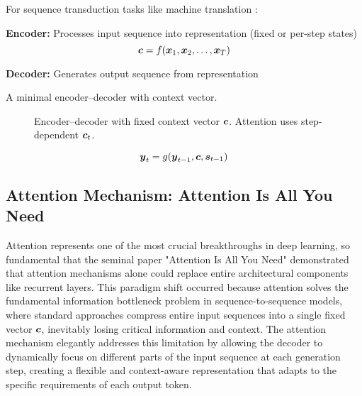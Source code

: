 For sequence transduction tasks like machine translation \cite{Cho2014,Bahdanau2014}:

\textbf{Encoder:} Processes input sequence into representation (fixed or per-step states)
\begin{equation}
\boldsymbol{c} = f(\boldsymbol{x}_1, \boldsymbol{x}_2, \ldots, \boldsymbol{x}_T)
\end{equation}

\textbf{Decoder:} Generates output sequence from representation


A minimal encoder–decoder with context vector.
\begin{figure}[h]
    \centering
    \caption{Encoder–decoder with fixed context vector $\boldsymbol{c}$. Attention uses step-dependent $\boldsymbol{c}_t$.}
\end{figure}

\begin{equation}
\boldsymbol{y}_t = g(\boldsymbol{y}_{t-1}, \boldsymbol{c}, \boldsymbol{s}_{t-1})
\end{equation}

\subsection{Attention Mechanism: Attention Is All You Need}

Attention represents one of the most crucial breakthroughs in deep learning, so fundamental that the seminal paper "Attention Is All You Need" \cite{Vaswani2017} demonstrated that attention mechanisms alone could replace entire architectural components like recurrent layers. This paradigm shift occurred because attention solves the fundamental information bottleneck problem in sequence-to-sequence models, where standard approaches compress entire input sequences into a single fixed vector $\boldsymbol{c}$, inevitably losing critical information and context. The attention mechanism elegantly addresses this limitation by allowing the decoder to dynamically focus on different parts of the input sequence at each generation step, creating a flexible and context-aware representation that adapts to the specific requirements of each output token.

